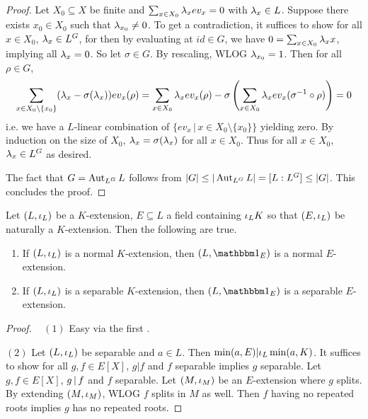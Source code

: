 \documentclass[main.tex]{subfiles}
\begin{document}
\begin{proof}
  Let $X_0 \subseteq X$ be finite and $\sum_{x \in X_0} \lambda_x ev_x = 0$
  with $\lambda_x \in L$. 
  Suppose there exists $x_0 \in X_0$ such that $\lambda_{x_0} \neq 0$. 
  To get a contradiction, 
  it suffices to show for all $x \in X_0$, $\lambda_x \in L^G$,
  for then by evaluating at $id \in G$, 
  we have $0 = \sum_{x \in X_0} \lambda_x x$,
  implying all $\lambda_x = 0$. 
  So let $\sigma \in G$.
  By rescaling, WLOG $\lambda_{x_0} = 1$. 
  Then for all $\rho \in G$, 
  \[
    \sum_{x \in X_0 \setminus\{x_0\}} (\lambda_x - \sigma(\lambda_x)) ev_x (\rho)
    = \sum_{x \in X_0} \lambda_x ev_x (\rho)
      - \sigma \left( 
        \sum_{x \in X_0} \lambda_x ev_x(\sigma^{-1} \circ \rho) 
      \right)
    = 0 
  \]
  i.e. we have a $L$-linear combination of 
  $\{ev_x \,|\, x \in X_0 \setminus \{x_0\}\}$ yielding zero.
  By induction on the size of $X_0$, 
  $\lambda_x = \sigma(\lambda_x)$ for all $x \in X_0$.
  Thus for all $x \in X_0$, $\lambda_x \in L^G$ as desired. 
  
  The fact that $G = \operatorname{Aut}_{L^G}{L}$ follows from 
  $|G| \leq |\operatorname{Aut}_{L^G}{L}| = [L : L^G] \leq |G|$.
  This concludes the proof. 
\end{proof}

\begin{lem}
  
  Let $(L,\iota_L)$ be a $K$-extension, $E \subseteq L$ a field containing $\iota_L K$
  so that $(E,\iota_L)$ be naturally a $K$-extension. 
  Then the following are true.  
  \begin{enumerate}
    \item If $(L,\iota_L)$ is a normal $K$-extension, 
    then $(L,\id{E})$ is a normal $E$-extension. 
    \item If $(L,\iota_L)$ is a separable $K$-extension, 
    then $(L,\id{E})$ is a separable $E$-extension. 
  \end{enumerate}
\end{lem}
\begin{proof}~
  $(1)$ Easy via the first 
  .

  $(2)$ Let $(L,\iota_L)$ be separable and $a \in L$. 
  Then $\min(a,E) | \iota_L \min(a,K)$. 
  It suffices to show for all $g, f \in E[X]$, 
  $g | f$ and $f$ separable implies $g$ separable. 
  Let $g, f \in E[X]$, $g\,|\, f$ and $f$ separable.
  Let $(M,\iota_M)$ be an $E$-extension where $g$ splits. 
  By extending $(M,\iota_M)$, WLOG $f$ splits in $M$ as well. 
  Then $f$ having no repeated roots implies $g$ has no repeated roots. 
\end{proof}
\end{document}
